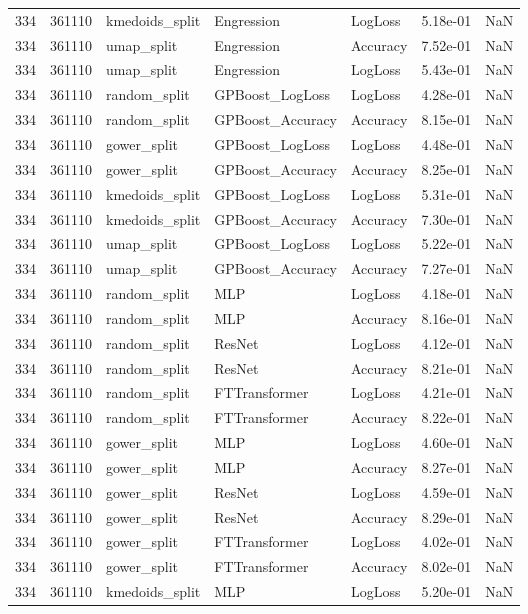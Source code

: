 \begin{tabular}{rrlllrr}
334 & 361110 & kmedoids\_split & Engression & LogLoss & 5.18e-01 & NaN \\
334 & 361110 & umap\_split & Engression & Accuracy & 7.52e-01 & NaN \\
334 & 361110 & umap\_split & Engression & LogLoss & 5.43e-01 & NaN \\
334 & 361110 & random\_split & GPBoost\_LogLoss & LogLoss & 4.28e-01 & NaN \\
334 & 361110 & random\_split & GPBoost\_Accuracy & Accuracy & 8.15e-01 & NaN \\
334 & 361110 & gower\_split & GPBoost\_LogLoss & LogLoss & 4.48e-01 & NaN \\
334 & 361110 & gower\_split & GPBoost\_Accuracy & Accuracy & 8.25e-01 & NaN \\
334 & 361110 & kmedoids\_split & GPBoost\_LogLoss & LogLoss & 5.31e-01 & NaN \\
334 & 361110 & kmedoids\_split & GPBoost\_Accuracy & Accuracy & 7.30e-01 & NaN \\
334 & 361110 & umap\_split & GPBoost\_LogLoss & LogLoss & 5.22e-01 & NaN \\
334 & 361110 & umap\_split & GPBoost\_Accuracy & Accuracy & 7.27e-01 & NaN \\
334 & 361110 & random\_split & MLP & LogLoss & 4.18e-01 & NaN \\
334 & 361110 & random\_split & MLP & Accuracy & 8.16e-01 & NaN \\
334 & 361110 & random\_split & ResNet & LogLoss & 4.12e-01 & NaN \\
334 & 361110 & random\_split & ResNet & Accuracy & 8.21e-01 & NaN \\
334 & 361110 & random\_split & FTTransformer & LogLoss & 4.21e-01 & NaN \\
334 & 361110 & random\_split & FTTransformer & Accuracy & 8.22e-01 & NaN \\
334 & 361110 & gower\_split & MLP & LogLoss & 4.60e-01 & NaN \\
334 & 361110 & gower\_split & MLP & Accuracy & 8.27e-01 & NaN \\
334 & 361110 & gower\_split & ResNet & LogLoss & 4.59e-01 & NaN \\
334 & 361110 & gower\_split & ResNet & Accuracy & 8.29e-01 & NaN \\
334 & 361110 & gower\_split & FTTransformer & LogLoss & 4.02e-01 & NaN \\
334 & 361110 & gower\_split & FTTransformer & Accuracy & 8.02e-01 & NaN \\
334 & 361110 & kmedoids\_split & MLP & LogLoss & 5.20e-01 & NaN \\

\end{tabular}
